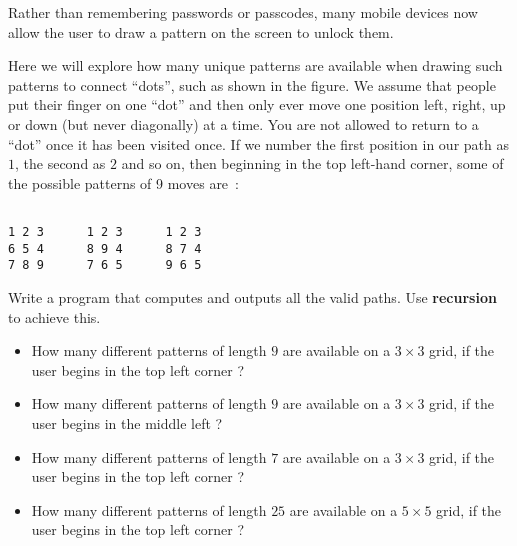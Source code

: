 
Rather than remembering passwords or passcodes, many mobile
devices now allow the user to draw a pattern on the screen to
unlock them.
\begin{center}
\end{center}

Here we will explore how many unique patterns are available
when drawing such patterns to connect ``dots'', such as shown in the
figure.
We assume that people put their finger on one ``dot'' and then only ever move
one position left, right, up or down (but never diagonally) at
a time. You are not allowed to return to a ``dot'' once it has
been visited once. If we number the first position in our path as $1$, the
second as $2$ and so on, then beginning in the top left-hand
corner, some of the possible patterns of 9 moves are~:
\begin{verbatim}

1 2 3      1 2 3      1 2 3
6 5 4      8 9 4      8 7 4
7 8 9      7 6 5      9 6 5

\end{verbatim}

\begin{exercise}
Write a program that computes and outputs all the valid paths.
Use \textbf{recursion} to achieve this.
\begin{itemize}
\item How many different patterns of length $9$ are
    available on a $3 \times 3$ grid, if the user begins in
    the top left corner ?

\item How many different patterns of length $9$ are
    available on a $3 \times 3$ grid, if the user begins in
    the middle left ?

\item How many different patterns of length $7$ are
    available on a $3 \times 3$ grid, if the user begins in
    the top left corner ?

\item How many different patterns of length $25$ are
    available on a $5 \times 5$ grid, if the user begins in
    the top left corner ?
\end{itemize}
\end{exercise}
